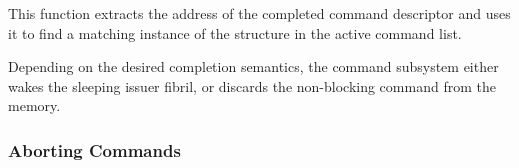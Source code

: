 This function extracts the address of the completed command descriptor and uses
it to find a matching instance of the  structure in the
active command list.

Depending on the desired completion semantics, the command subsystem either
wakes the sleeping issuer fibril, or discards the non-blocking command from the
memory.


\subsubsection{Aborting Commands}


